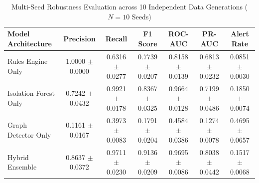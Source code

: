\begin{table}[t]
\centering
\caption{Multi-Seed Robustness Evaluation across 10 Independent Data Generations ($N=10$ Seeds)}
\label{tab:multi_seed_robustness}
\begin{tabular}{lcccccc}
\toprule
\textbf{Model Architecture} & \textbf{Precision} & \textbf{Recall} & \textbf{F1 Score} & \textbf{ROC-AUC} & \textbf{PR-AUC} & \textbf{Alert Rate} \\
\midrule
Rules Engine Only & 1.0000 $\pm$ 0.0000 & 0.6316 $\pm$ 0.0277 & 0.7739 $\pm$ 0.0207 & 0.8158 $\pm$ 0.0139 & 0.6813 $\pm$ 0.0232 & 0.0851 $\pm$ 0.0030 \\
Isolation Forest Only & 0.7242 $\pm$ 0.0432 & 0.9921 $\pm$ 0.0178 & 0.8367 $\pm$ 0.0325 & 0.9664 $\pm$ 0.0128 & 0.7199 $\pm$ 0.0486 & 0.1850 $\pm$ 0.0074 \\
Graph Detector Only & 0.1161 $\pm$ 0.0167 & 0.3973 $\pm$ 0.0083 & 0.1791 $\pm$ 0.0204 & 0.4584 $\pm$ 0.0386 & 0.1274 $\pm$ 0.0078 & 0.4695 $\pm$ 0.0657 \\
Hybrid Ensemble & 0.8637 $\pm$ 0.0372 & 0.9711 $\pm$ 0.0230 & 0.9136 $\pm$ 0.0209 & 0.9695 $\pm$ 0.0086 & 0.8038 $\pm$ 0.0442 & 0.1517 $\pm$ 0.0068 \\
\bottomrule
\end{tabular}
\end{table}
